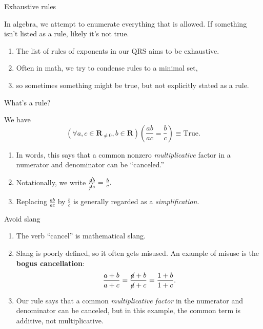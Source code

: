 \documentclass[portrait,fleqn,12pt]{beamer}
\newcommand{\reals}{\mathbf{R}}
\newenvironment{handlist}
   {\begin{enumerate}[\faHandPointRight]
       \addtolength{\itemsep}{0.0\itemsep}}
     {\end{enumerate}}
\begin{document}
\begin{frame}{Exhaustive rules}

In algebra, we attempt to enumerate everything that is allowed. If something isn't listed as a rule, likely it's not true.

\begin{handlist}
\item The list of rules of exponents in our QRS aims to be exhaustive.

\item  Often in math, we try  to condense rules to a minimal set, 

\item so sometimes something might be true, but not explicitly stated as a rule.
\end{handlist}

\end{frame}



\begin{frame}{What's a  rule?}

\begin{theorem} We have 
\begin{equation*} 
   \left(\forall a, c\in \reals_{\neq 0}, b \in \reals \right)\left(\frac{a b}{a c} = \frac{b}{c} \right) \equiv \text{True}.
  \end{equation*}
\end{theorem}

\begin{handlist}
\item In words, this says that a common nonzero \emph{multiplicative} factor in a numerator and denominator can be ``canceled.''
\item Notationally, we write 
$
\frac{\cancel{a} b}{ \cancel{a} c}  = \frac{b}{c}.
$
\item Replacing $\frac{a b}{a c}$ by $\frac{b}{c}$ is generally regarded as a \emph{simplification.}

\end{handlist}

\end{frame}

\begin{frame}{Avoid slang}

\begin{handlist}

\item The verb ``cancel''  is mathematical slang.  
\item Slang is poorly defined, so it  often gets misused. An example of misuse is the \textbf{bogus cancellation}:
\begin{equation*}
   \frac{a+b}{a+c} =  \frac{\cancel{a}+b}{\cancel{a} +c} = \frac{1 + b}{1 + c}.
\end{equation*}
\item Our rule says that a common \emph{multiplicative factor} in the numerator and denominator can be canceled, but in this example, the common term is additive, not multiplicative.
\end{handlist}

\end{frame}
\end{document}
